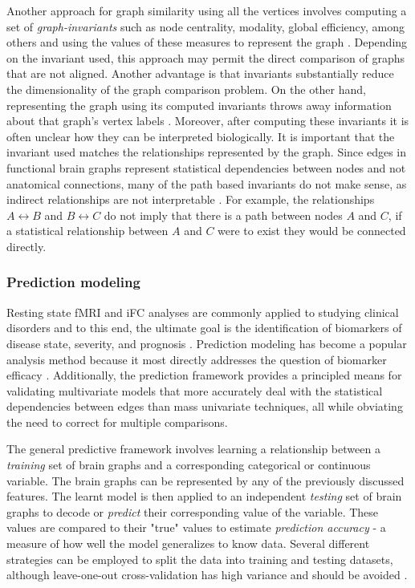 \documentclass{bmcart}
\begin{document}
Another approach for graph similarity using all the vertices involves computing a set of \emph{graph-invariants} such as node centrality, modality, global efficiency, among others and using the values of these measures to represent the graph \cite{Rubinov2010,Bullmore2011}. Depending on the invariant used, this approach may permit the direct comparison of graphs that are not aligned. Another advantage is that invariants substantially reduce the dimensionality of the graph comparison problem. On the other hand, representing the graph using its computed invariants throws away information about that graph's vertex labels \cite{Vogelstein2013}. Moreover, after computing these invariants it is often unclear how they can be interpreted biologically. It is important that the invariant used matches the relationships represented by the graph. Since edges in functional brain graphs represent statistical dependencies between nodes and not anatomical connections, many of the path based invariants do not make sense, as indirect relationships are not interpretable \cite{Rubinov2010}. For example, the relationships $A \leftrightarrow B$ and $B \leftrightarrow C$ do not imply that there is a path between nodes $A$ and $C$, if a statistical relationship between $A$ and $C$ were to exist they would be connected directly.   

\subsubsection{Prediction modeling}

Resting state fMRI and iFC analyses are commonly applied to studying clinical disorders and to this end, the ultimate goal is the identification of biomarkers of disease state, severity, and prognosis \cite{Castellanos2013}. Prediction modeling has become a popular analysis method because it most directly addresses the question of biomarker efficacy \cite{Craddock2009, Dosenbach2010, Richiardi2013}. Additionally, the prediction framework provides a principled means for validating multivariate models that more accurately deal with the statistical dependencies between edges than mass univariate techniques, all while obviating the need to correct for multiple comparisons. 

The general predictive framework involves learning a relationship between a \emph{training} set of brain graphs and a corresponding categorical or continuous variable. The brain graphs can be represented by any of the previously discussed features. The learnt model is then applied to an independent \emph{testing} set of brain graphs to decode or \emph{predict} their corresponding value of the variable. These values are compared to their "true" values to estimate \emph{prediction accuracy} - a measure of how well the model generalizes to know data. Several different strategies can be employed to split the data into training and testing datasets, although leave-one-out cross-validation has high variance and should be avoided \cite{james2014introduction}. 
\end{document}
